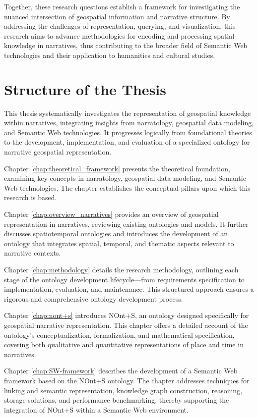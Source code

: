 Together, these research questions establish a framework for investigating the nuanced intersection of geospatial information and narrative structure. By addressing the challenges of representation, querying, and visualization, this research aims to advance methodologies for encoding and processing spatial knowledge in narratives, thus contributing to the broader field of Semantic Web technologies and their application to humanities and cultural studies.


\section{Structure of the Thesis}\label{I-sec:StructureOfTheThesis}

This thesis systematically investigates the representation of geospatial knowledge within narratives, integrating insights from narratology, geospatial data modeling, and Semantic Web technologies. It progresses logically from foundational theories to the development, implementation, and evaluation of a specialized ontology for narrative geospatial representation.

Chapter \ref{chap:theoretical_framework} presents the theoretical foundation, examining key concepts in narratology, geospatial data modeling, and Semantic Web technologies. The chapter establishes the conceptual pillars upon which this research is based.

Chapter \ref{chap:overview_narratives} provides an overview of geospatial representation in narratives, reviewing existing ontologies and models. It further discusses spatiotemporal ontologies and introduces the development of an ontology that integrates spatial, temporal, and thematic aspects relevant to narrative contexts.

Chapter \ref{chap:methodology} details the research methodology, outlining each stage of the ontology development lifecycle—from requirements specification to implementation, evaluation, and maintenance. This structured approach ensures a rigorous and comprehensive ontology development process.

Chapter \ref{chap:nont+s} introduces NOnt+S, an ontology designed specifically for geospatial narrative representation. This chapter offers a detailed account of the ontology's conceptualization, formalization, and mathematical specification, covering both qualitative and quantitative representations of place and time in narratives.

Chapter \ref{chap:SW-framework} describes the development of a Semantic Web framework based on the NOnt+S ontology. The chapter addresses techniques for linking and semantic representation, knowledge graph construction, reasoning, storage solutions, and performance benchmarking, thereby supporting the integration of NOnt+S within a Semantic Web environment.

